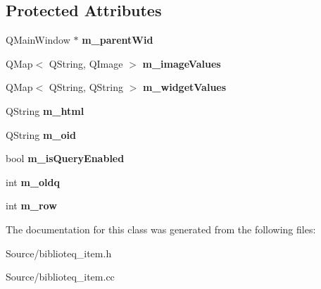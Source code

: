 \subsection*{Protected Attributes}
\begin{DoxyCompactItemize}
\item 
Q\+Main\+Window $\ast$ {\bfseries m\+\_\+parent\+Wid}\hypertarget{classbiblioteq__item_aa90391a905a672a1943b93bf05d2aa60}{}\label{classbiblioteq__item_aa90391a905a672a1943b93bf05d2aa60}

\item 
Q\+Map$<$ Q\+String, Q\+Image $>$ {\bfseries m\+\_\+image\+Values}\hypertarget{classbiblioteq__item_a9bae246902c0170277c03663c6aec2cc}{}\label{classbiblioteq__item_a9bae246902c0170277c03663c6aec2cc}

\item 
Q\+Map$<$ Q\+String, Q\+String $>$ {\bfseries m\+\_\+widget\+Values}\hypertarget{classbiblioteq__item_a1fc18aef2f077ba7b6e872a50ba34b24}{}\label{classbiblioteq__item_a1fc18aef2f077ba7b6e872a50ba34b24}

\item 
Q\+String {\bfseries m\+\_\+html}\hypertarget{classbiblioteq__item_a1c79543a0d8070ff5e143791275d332c}{}\label{classbiblioteq__item_a1c79543a0d8070ff5e143791275d332c}

\item 
Q\+String {\bfseries m\+\_\+oid}\hypertarget{classbiblioteq__item_a154463dc3fe45fe19b055e4361ee3f78}{}\label{classbiblioteq__item_a154463dc3fe45fe19b055e4361ee3f78}

\item 
bool {\bfseries m\+\_\+is\+Query\+Enabled}\hypertarget{classbiblioteq__item_ae7e4923f4e6c809f3480dcf3583a00e1}{}\label{classbiblioteq__item_ae7e4923f4e6c809f3480dcf3583a00e1}

\item 
int {\bfseries m\+\_\+oldq}\hypertarget{classbiblioteq__item_a1e969ab09e319001a6d8d709e8f80d0c}{}\label{classbiblioteq__item_a1e969ab09e319001a6d8d709e8f80d0c}

\item 
int {\bfseries m\+\_\+row}\hypertarget{classbiblioteq__item_a638cf673c669e8f11e219289917617bd}{}\label{classbiblioteq__item_a638cf673c669e8f11e219289917617bd}

\end{DoxyCompactItemize}


The documentation for this class was generated from the following files\+:\begin{DoxyCompactItemize}
\item 
Source/biblioteq\+\_\+item.\+h\item 
Source/biblioteq\+\_\+item.\+cc\end{DoxyCompactItemize}
